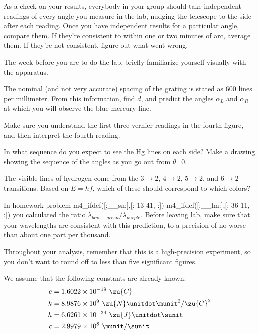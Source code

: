 As a check on your results,
everybody in your group should take independent readings of every
angle you measure in the lab, nudging the telescope to the side after
each reading. Once you have independent results for a particular angle,
compare them. If they're consistent to within one or two minutes of
arc, average them. If they're not consistent, figure out what went
wrong.

\prelab

The week before you are to do the lab, briefly familiarize
yourself visually with the apparatus.

\prelabquestion  
The nominal (and not very accurate) spacing of the grating is stated
as 600 lines per millimeter. From this information, find $d$, and
predict the angles $\alpha_L$ and $\alpha_R$ at which you will observe the blue mercury line.


\prelabquestion  Make sure you understand the first three vernier
readings in the fourth figure, and then interpret the fourth reading.

\prelabquestion  In what sequence do you expect to see the Hg lines on
each side? Make a drawing showing the sequence of the angles
as you go out from $\theta $=0.

\prelabquestion  
The visible lines of hydrogen come from the $3\rightarrow2$,
$4\rightarrow2$, $5\rightarrow2$, and $6\rightarrow2$
transitions. Based on $E=hf$, which of these should
correspond to which colors?

\selfcheck

In homework problem
m4_ifdef([:__sn:],[:%
13-41,%
:])%
m4_ifdef([:__lm:],[:%
36-11,%
:])%
you calculated the ratio $\lambda_{blue-green}/\lambda_{purple}$.
Before leaving lab, make sure that your wavelengths are consistent with this prediction,
to a precision of no worse than about one part per thousand.

\analysis

Throughout your analysis, remember that this is a high-precision
experiment, so you don't want to round off to less than five
significant figures.

We assume
that the following constants are already known:
\begin{align*}
  e	&= 1.6022\times10^{-19}\ \zu{C}\\
  k	&= 8.9876\times10^9\ \zu{N}\unitdot\munit^2/\zu{C}^2 \\
  h	&= 6.6261\times10^{-34}\ \zu{J}\unitdot\sunit \\
  c     &= 2.9979\times10^8\ \munit/\sunit
\end{align*}


